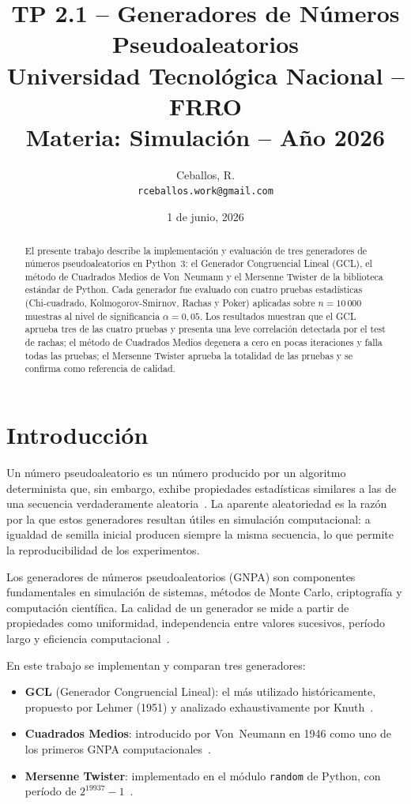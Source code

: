\documentclass[a4paper, 11pt]{article}
\title{%
  \textbf{TP 2.1 -- Generadores de Números Pseudoaleatorios} \\[6pt]
  \large Universidad Tecnológica Nacional -- FRRO \\
  \large Materia: Simulación -- Año 2026
}
\author{
  Ceballos, R. \\
  \texttt{rceballos.work@gmail.com}
}
\date{1 de junio, 2026}
\begin{document}
\maketitle

\begin{abstract}
El presente trabajo describe la implementación y evaluación de tres generadores
de números pseudoaleatorios en Python~3: el Generador Congruencial Lineal (GCL),
el método de Cuadrados Medios de Von~Neumann y el Mersenne Twister de la
biblioteca estándar de Python. Cada generador fue evaluado con cuatro pruebas
estadísticas (Chi-cuadrado, Kolmogorov-Smirnov, Rachas y Poker) aplicadas sobre
$n = 10\,000$ muestras al nivel de significancia $\alpha = 0{,}05$. Los
resultados muestran que el GCL aprueba tres de las cuatro pruebas y presenta
una leve correlación detectada por el test de rachas; el método de Cuadrados
Medios degenera a cero en pocas iteraciones y falla todas las pruebas; el
Mersenne Twister aprueba la totalidad de las pruebas y se confirma como
referencia de calidad.
\end{abstract}

\section{Introducción}

Un número pseudoaleatorio es un número producido por un algoritmo determinista
que, sin embargo, exhibe propiedades estadísticas similares a las de una secuencia
verdaderamente aleatoria~\cite{knuth1997art}. La aparente aleatoriedad es la razón
por la que estos generadores resultan útiles en simulación computacional: a
igualdad de semilla inicial producen siempre la misma secuencia, lo que permite
la reproducibilidad de los experimentos.

Los generadores de números pseudoaleatorios (GNPA) son componentes fundamentales
en simulación de sistemas, métodos de Monte Carlo, criptografía y computación
científica. La calidad de un generador se mide a partir de propiedades como
uniformidad, independencia entre valores sucesivos, período largo y eficiencia
computacional~\cite{law2015simulation}.

En este trabajo se implementan y comparan tres generadores:
\begin{itemize}
  \item \textbf{GCL} (Generador Congruencial Lineal): el más utilizado
        históricamente, propuesto por Lehmer (1951) y analizado exhaustivamente
        por Knuth~\cite{knuth1997art}.
  \item \textbf{Cuadrados Medios}: introducido por Von~Neumann en 1946 como
        uno de los primeros GNPA computacionales~\cite{vonneumann1951various}.
  \item \textbf{Mersenne Twister}: implementado en el módulo \texttt{random}
        de Python, con período de $2^{19937}-1$~\cite{matsumoto1998mersenne}.
\end{itemize}
\end{document}

